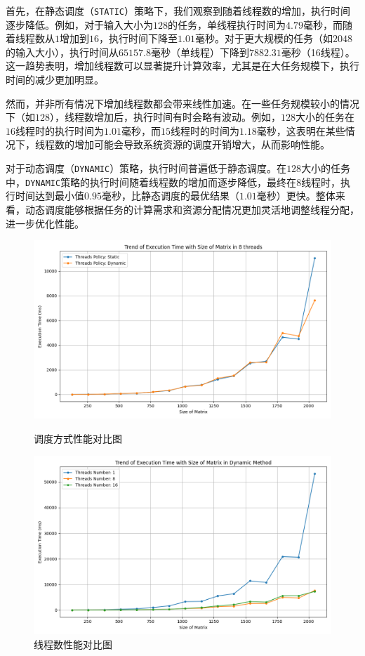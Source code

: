 \documentclass[a4paper, utf8]{ctexart}
\begin{document}
	首先，在静态调度（\verb|STATIC|）策略下，我们观察到随着线程数的增加，执行时间逐步降低。例如，对于输入大小为$128$的任务，单线程执行时间为$4.79$毫秒，而随着线程数从$1$增加到$16$，执行时间下降至$1.01$毫秒。对于更大规模的任务（如$2048$的输入大小），执行时间从$65157.8$毫秒（单线程）下降到$7882.31$毫秒（16线程）。这一趋势表明，增加线程数可以显著提升计算效率，尤其是在大任务规模下，执行时间的减少更加明显。
	
	然而，并非所有情况下增加线程数都会带来线性加速。在一些任务规模较小的情况下（如$128$），线程数增加后，执行时间有时会略有波动。例如，$128$大小的任务在$16$线程时的执行时间为$1.01$毫秒，而$15$线程时的时间为$1.18$毫秒，这表明在某些情况下，线程数的增加可能会导致系统资源的调度开销增大，从而影响性能。
	
	对于动态调度（\verb|DYNAMIC|）策略，执行时间普遍低于静态调度。在$128$大小的任务中，\verb|DYNAMIC|策略的执行时间随着线程数的增加而逐步降低，最终在$8$线程时，执行时间达到最小值$0.95$毫秒，比静态调度的最优结果（$1.01$毫秒）更快。整体来看，动态调度能够根据任务的计算需求和资源分配情况更加灵活地调整线程分配，进一步优化性能。
	
	\begin{figure}[htbp]
		\centering
		\begin{minipage}{.45\textwidth}
			\centering
			\includegraphics[width=.8\textwidth]{./figure/method_time_trend.png}
			\caption{调度方式性能对比图}
		\end{minipage}
		\begin{minipage}{.45\textwidth}
			\centering
			\includegraphics[width=.8\textwidth]{./figure/threads_time_trend.png}
			\caption{线程数性能对比图}
		\end{minipage}
	\end{figure}
	
\end{document}
